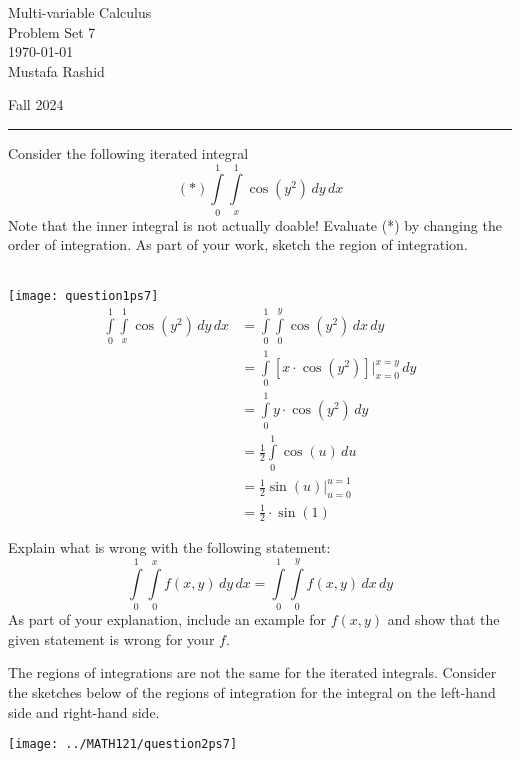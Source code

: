 \documentclass[12pt,letterpaper, onecolumn]{exam}
\newcommand{\Int}{\int\limits}
\begin{document}
	
	\begingroup  
	\centering
	\LARGE Multi-variable Calculus\\
	\LARGE Problem Set 7\\[0.5em]
	\large \today\\[0.5em]
	\large Mustafa Rashid\par
	\large Fall 2024\par
	\endgroup
	\rule{\textwidth}{0.4pt}
	\pointsdroppedatright
	\printanswers
	\renewcommand{\solutiontitle}{\noindent\textbf{Ans:}\enspace}  
	
	
	
\begin{questions}
	\question Consider the following iterated integral
	$$(*)\Int_{0}^{1} \Int_{x}^{1}\cos(y^2) \,dy\,dx$$
	Note that the inner integral is not actually doable! Evaluate (*) by changing the order of integration. As part of your work, sketch the region of integration.
	\begin{solution}\\
			\texttt{[image: question1ps7]}
		\begin{align*}
			\Int_{0}^{1} \Int_{x}^{1}\cos(y^2) \,dy\,dx&=\Int_{0}^{1} \Int_{0}^{y}\cos(y^2) \,dx\,dy\\
			&=	\Int_{0}^{1} \left[x\cdot \cos(y^2)\right]\Big|_{x=0}^{x=y}\,dy\\
			&=\Int_{0}^{1} y\cdot\cos(y^2)\,dy\tag{By u-substitution, let $u=y^2$}\\
			&=\frac{1}{2}\Int_{0}^{1} \cos(u)\,du\\
			&=\frac{1}{2}\sin(u)\Big|_{u=0}^{u=1}\\
			&=\frac{1}{2}\cdot \sin(1)
		\end{align*}
	\end{solution}
	\pagebreak
	\question Explain what is wrong with the following statement:
		$$\Int_{0}^{1} \Int_{0}^{x}f(x,y)\,dy\,dx=\Int_{0}^{1} \Int_{0}^{y}f(x,y)\,dx\,dy$$
		As part of your explanation, include an example for $f(x,y)$ and show that the given statement is wrong for your $f$.
	\begin{solution}
		The regions of integrations are not the same for the iterated integrals. Consider the sketches below of the regions of integration for the integral on the left-hand side and right-hand side.
		\begin{center}
			\texttt{[image: ../MATH121/question2ps7]}
		\end{center}
		

\end{solution}
\end{questions}
\end{document}
